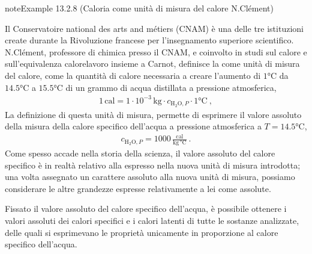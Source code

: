 \documentclass[letterpaper,10pt,italian]{jupyterBook}
\begin{document}
\begin{sphinxadmonition}{note}{Example 13.2.8 (Caloria come unità di misura del calore \sphinxhyphen{} N.Clément)}



\sphinxAtStartPar
Il Conservatoire national des arts and métiers (CNAM) è una delle tre istituzioni create durante la Rivoluzione francese per l’insegnamento superiore scientifico. N.Clément, professore di chimica presso il CNAM, e coinvolto in studi sul calore e sull’equivalenza calore\sphinxhyphen{}lavoro insieme a Carnot, definisce la  come unità di misura del calore, come la quantità di calore necessaria a creare l’aumento di \(1 \text{°C}\) da \(14.5 \text{°C}\) a \(15.5 \text{°C}\) di un grammo di acqua distillata a pressione atmosferica,
\begin{equation*}
\begin{split}1 \, \text{cal} = 1 \cdot 10^{-3} \, \text{kg} \cdot c_{\text{H$_2$O},P} \cdot 1 \text{°C} \ ,\end{split}
\end{equation*}
\sphinxAtStartPar
La definizione di questa unità di misura, permette di esprimere il valore assoluto della misura della calore specifico dell’acqua a pressione atmosferica a \(T = 14.5 \text{°C}\),
\begin{equation*}
\begin{split}c_{\text{H$_2$O},P} = 1000 \, \frac{\text{cal}}{\text{kg} \, \text{°C}} \ .\end{split}
\end{equation*}
\sphinxAtStartPar
{} Come spesso accade nella storia della scienza, il valore assoluto del calore specifico è in realtà relativo alla \sphinxhyphen{} espresso nella \sphinxhyphen{} nuova unità di misura introdotta; una volta assegnato un carattere assoluto alla nuova unità di misura, possiamo considerare le altre grandezze espresse relativamente a lei come assolute.

\sphinxAtStartPar
{} Fissato il valore assoluto del calore specifico dell’acqua, è possibile ottenere i valori assoluti dei calori specifici e i calori latenti di tutte le sostanze analizzate, delle quali si esprimevano le proprietà unicamente in proporzione al calore specifico dell’acqua.
\end{sphinxadmonition}
\end{document}
